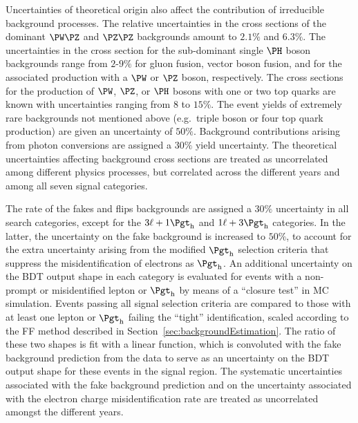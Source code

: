 Uncertainties of theoretical origin also affect the contribution of irreducible background processes.
The relative uncertainties in the cross sections of the dominant $\PW\PZ$ and $\PZ\PZ$ backgrounds
amount to $2.1\%$ and $6.3\%$. %
The uncertainties in the cross section for the sub-dominant single $\PHiggs$ boson backgrounds
range from $2$-$9\%$ for gluon fusion, vector boson fusion, and for the associated production with a
$\PW$ or $\PZ$ boson, respectively. %
The cross sections for the production of $\PW$, $\PZ$, or $\PHiggs$ bosons with one or two top quarks
are known with uncertainties ranging from $8$ to $15\%$. %
The event yields of extremely rare backgrounds not mentioned above
(e.g.~triple boson or four top quark production) are given an uncertainty of $50\%$.
Background contributions arising from photon conversions
are assigned a $30\%$ yield uncertainty.
The theoretical uncertainties affecting background cross sections are treated
as uncorrelated among different physics processes, but correlated across
the different years and among all seven signal categories.

The rate of the fakes and flips backgrounds are assigned a $30\%$
uncertainty in all search categories, except for the $\lllt$ and $\lttt$ categories.
In the latter, the uncertainty on the fake background is increased to $50\%$,
to account for the extra uncertainty arising from the modified $\tauh$ selection criteria that suppress the misidentification of electrons as $\tauh$.
An additional uncertainty on the BDT output shape in each category is
evaluated for events with a non-prompt or misidentified lepton or $\tauh$
by means of a ``closure test'' in MC simulation.
Events passing all signal selection criteria are compared to those
with at least one lepton or $\tauh$ failing the ``tight'' identification,
scaled according to the FF method described in
Section~\ref{sec:backgroundEstimation}.
The ratio of these two shapes is fit with a linear function, which
is convoluted with the fake background prediction
from the data to serve as an uncertainty on the BDT output shape
for these events in the signal region.
The systematic uncertainties associated with the fake
background prediction and on the uncertainty associated with the electron charge misidentification rate are treated as uncorrelated amongst the different
years.

